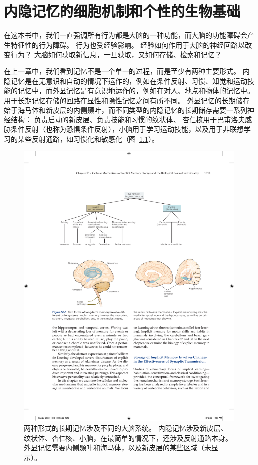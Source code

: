 \chapter{内隐记忆的细胞机制和个性的生物基础} \label{chap:chap53}

在这本书中，我们一直强调所有行为都是大脑的一种功能，而大脑的功能障碍会产生特征性的行为障碍。
行为也受经验影响。
经验如何作用于大脑的神经回路以改变行为？
大脑如何获取新信息，一旦获取，又如何存储、检索和记忆？


在上一章中，我们看到记忆不是一个单一的过程，而是至少有两种主要形式。
内隐记忆是在无意识和自动的情况下运作的，例如在条件反射、习惯、知觉和运动技能的记忆中，而外显记忆是有意识地运作的，例如在对人、地点和物体的记忆中。
用于长期记忆存储的回路在显性和隐性记忆之间有所不同。
外显记忆的长期储存始于海马体和新皮层的内侧颞叶，而不同类型的内隐记忆的长期储存需要一系列神经结构：
负责启动的新皮层、负责技能和习惯的纹状体、 杏仁核用于巴甫洛夫威胁条件反射（也称为恐惧条件反射），小脑用于学习运动技能，以及用于非联想学习的某些反射通路，如习惯化和敏感化（图~\ref{fig:53_1}）。


\begin{figure}[htbp]
	\centering
	\includegraphics[width=0.9\linewidth]{chap53/fig_53_1}
	\caption{两种形式的长期记忆涉及不同的大脑系统。
		内隐记忆涉及新皮层、纹状体、杏仁核、小脑，在最简单的情况下，还涉及反射通路本身。
		外显记忆需要内侧颞叶和海马体，以及新皮层的某些区域（未显示）。}
	\label{fig:53_1}
\end{figure}


